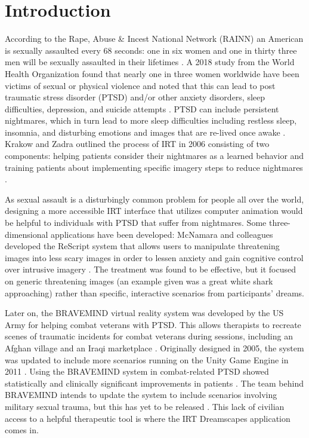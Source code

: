\documentclass{article}
\begin{document}
\section*{Introduction}

According to the Rape, Abuse \& Incest National Network (RAINN) an American is sexually assaulted every 68 seconds: one in six women and one in thirty three men will be sexually assaulted in their lifetimes \cite{RAINN}. A 2018 study from the World Health Organization found that nearly one in three women worldwide have been victims of sexual or physical violence and noted that this can lead to post traumatic stress disorder (PTSD) and/or other anxiety disorders, sleep difficulties, depression, and suicide attempts \cite{WHO}. PTSD can include persistent nightmares, which in turn lead to more sleep difficulties including restless sleep, insomnia, and disturbing emotions and images that are re-lived once awake \cite{KrakowZadraClinical}. Krakow and Zadra outlined the process of IRT in 2006 consisting of two components: helping patients consider their nightmares as a learned behavior and training patients about implementing specific imagery steps to reduce nightmares \cite{KrakowZadraClinical}.

As sexual assault is a disturbingly common problem for people all over the world, designing a more accessible IRT interface that utilizes computer animation would be helpful to individuals with PTSD that suffer from nightmares. Some three-dimensional applications have been developed: McNamara and colleagues developed the ReScript system that allows users to manipulate threatening images into less scary images in order to lessen anxiety and gain cognitive control over intrusive imagery \cite{McNamara}. The treatment was found to be effective, but it focused on generic threatening images (an example given was a great white shark approaching) \cite{McNamara} rather than specific, interactive scenarios from participants’ dreams.

Later on, the BRAVEMIND virtual reality system was developed by the US Army for helping combat veterans with PTSD. This allows therapists to recreate scenes of traumatic incidents for combat veterans during sessions, including an Afghan village and an Iraqi marketplace \cite{BRAVEMIND}. Originally designed in 2005, the system was updated to include more scenarios running on the Unity Game Engine in 2011 \cite{Rizzo}. Using the BRAVEMIND system in combat-related PTSD showed statistically and clinically significant improvements in patients \cite{Rizzo}. The team behind BRAVEMIND intends to update the system to include scenarios involving military sexual trauma, but this has yet to be released \cite{Rizzo}. This lack of civilian access to a helpful therapeutic tool is where the IRT Dreamscapes application comes in.
\end{document}
